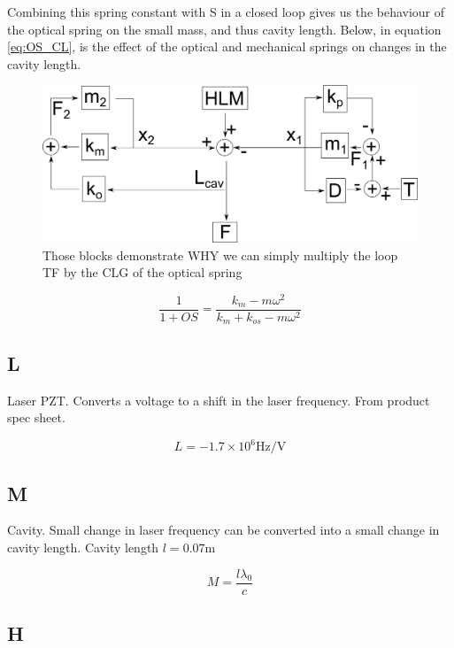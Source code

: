 Combining this spring constant with S in a closed loop gives us the behaviour of the optical spring on the small mass, and thus cavity length.  Below, in equation \ref{eq:OS_CL}, is the effect of the optical and mechanical springs on changes in the cavity length.

\begin{figure}%
\includegraphics[width=\columnwidth]{figures/controls/blocks2.png}%
\caption{Those blocks demonstrate WHY we can simply multiply the loop TF by the CLG of the optical spring }%
\label{fig:cavityloopblocks}%
\end{figure}

\begin{equation}
\frac{1}{1+OS} = \frac{k_m-m\omega^2}{k_m+k_{os}-m\omega^2}
\label{eq:OS_CL}
\end{equation}

\subsection{L}

Laser PZT.  Converts a voltage to a shift in the laser frequency. From product spec sheet.

\begin{equation}
L = -1.7\times 10^6 \mbox{Hz/V}
\label{eq:L}
\end{equation}

\subsection{M}

Cavity.  Small change in laser frequency can be converted into a small change in cavity length.  Cavity length $l = 0.07\mbox{m}$

\begin{equation}
M=\frac{l\lambda_0}{c}
\label{eq:loopM}
\end{equation}


\subsection{H}

